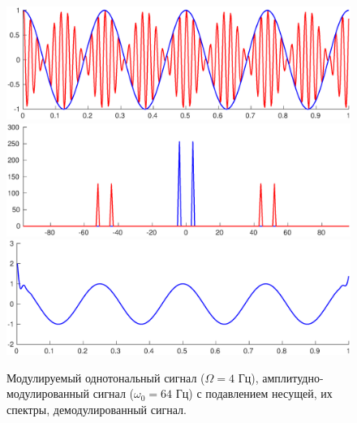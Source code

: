 \documentclass[a4paper,14pt]{extarticle}
\begin{document}
\begin{figure}[p]
\centering
\includegraphics[width=1\textwidth]{ammod_m_inf.eps}
\includegraphics[width=1\textwidth]{ammod_s_m_inf.eps}
\includegraphics[width=1\textwidth]{amdemod_m_inf.eps}
\captionsetup{justification=centering,margin=0.5cm}
\caption{Модулируемый однотональный сигнал ($\Omega = 4$ Гц), амплитудно-модулированный сигнал ($\omega_0 = 64$ Гц) с подавлением несущей, их спектры, демодулированный сигнал.}
\label{am3}
\end{figure}
\end{document}

